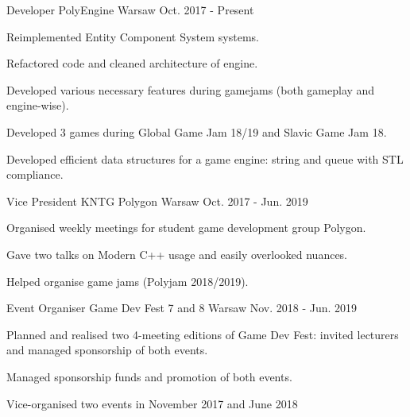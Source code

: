 

\begin{cventries}
    \cventry
    {Developer} %
    {PolyEngine} %
    {Warsaw}
    {Oct. 2017 - Present} %
    {
      \begin{cvitems} %
        \item {Reimplemented Entity Component System systems.}
        \item {Refactored code and cleaned architecture of engine.}
        \item {Developed various necessary features during gamejams (both gameplay and engine-wise).}
        \item {Developed 3 games during Global Game Jam 18/19 and Slavic Game Jam 18.}
        \item {Developed efficient data structures for a game engine: string and queue with STL compliance.}
      \end{cvitems}
    }
    \cventry
    {Vice President} %
    {KNTG Polygon} %
    {Warsaw} %
    {Oct. 2017 - Jun. 2019} %
    {
      \begin{cvitems} %
        \item {Organised weekly meetings for student game development group Polygon.}
        \item {Gave two talks on Modern C++ usage and easily overlooked nuances.}
        \item {Helped organise game jams (Polyjam 2018/2019).}
      \end{cvitems}
    }

    \cventry
    {Event Organiser} %
    {Game Dev Fest 7 and 8} %
    {Warsaw} %
    {Nov. 2018 - Jun. 2019} %
    {
      \begin{cvitems} %
        \item {Planned and realised two 4-meeting editions of Game Dev Fest: invited lecturers and managed sponsorship of both events.}
        \item {Managed sponsorship funds and promotion of both events.}
        \item {Vice-organised two events in November 2017 and June 2018}
      \end{cvitems}
    }


\end{cventries}

